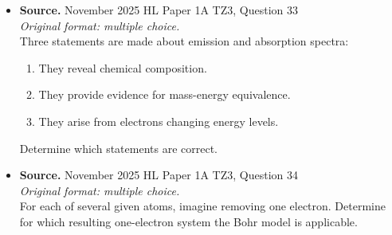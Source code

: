 \documentclass[11pt]{article}
\begin{document}
\begin{itemize}[leftmargin=1.25em]
\item
\textbf{Source.} November 2025 HL Paper 1A TZ3, Question 33\\
\textit{Original format: multiple choice.}\\
Three statements are made about emission and absorption spectra:
\begin{enumerate}[label=\Roman*., leftmargin=1.5em]
\item They reveal chemical composition.
\item They provide evidence for mass-energy equivalence.
\item They arise from electrons changing energy levels.
\end{enumerate}
Determine which statements are correct.
\item
\textbf{Source.} November 2025 HL Paper 1A TZ3, Question 34\\
\textit{Original format: multiple choice.}\\
For each of several given atoms, imagine removing one electron. Determine for which resulting one-electron system the Bohr model is applicable.
\end{itemize}
\end{document}
